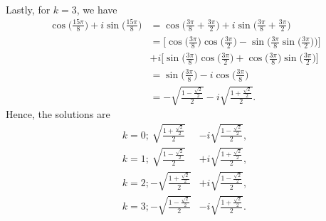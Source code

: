 \documentclass[a4paper]{article}
\begin{document}
\begin{enumerate}
\begin{solution}
\begin{align*}
                \end{align*}
                Lastly, for \( k = 3  \), we have
                \begin{align*}
                    \cos \Big(  \frac{ 15 \pi  }{ 8  }  \Big) + i \sin \Big(  \frac{ 15 \pi  }{ 8 }  \Big) &= \cos \Big(  \frac{ 3 \pi  }{ 8 }  + \frac{ 3 \pi  }{  2  }  \Big) + i \sin \Big(  \frac{ 3 \pi  }{ 8  }  + \frac{ 3 \pi  }{  2  }  \Big) \\
                                                                                                           &= \Big[ \cos \Big(  \frac{ 3 \pi  }{  8  }   \Big) \cos \Big(  \frac{ 3 \pi  }{  2 }  \Big) - \sin \Big(  \frac{ 3 \pi  }{  8  } \sin \Big(  \frac{ 3 \pi }{ 2 }  \Big) \Big)\Big]  \\
                                                                                                           &+ i \Big[ \sin \Big(  \frac{ 3 \pi  }{ 8  } \Big)  \cos \Big(  \frac{ 3 \pi }{ 2 }  \Big)  + \cos \Big(  \frac{ 3 \pi  }{ 8  } \Big)  \sin \Big(  \frac{ 3 \pi  }{  2  }   \Big) \Big] \\
                                                                                                           &= \sin \Big(  \frac{ 3 \pi  }{  8  }  \Big) - i \cos \Big(  \frac{ 3 \pi  }{ 8  }  \Big) \\
                                                                                                           &= -\sqrt{ \frac{ 1 - \frac{ \sqrt{ 2 }   }{ 2 }  }{ 2 }  }  - i \sqrt{ \frac{ 1 + \frac{ \sqrt{ 2 }  }{ 2 }  }{ 2 }  }.
                \end{align*}
                Hence, the solutions are 
                \begin{align*}
                    k = 0;  \  \sqrt{ \frac{ 1 + \frac{ \sqrt{ 2 }  }{ 2 }  }{ 2 }  }  &- i \sqrt{ \frac{ 1 - \frac{ \sqrt{ 2 }  }{ 2 }  }{ 2 }   },  \\
                    k = 1; \  \sqrt{ \frac{ 1 - \frac{ \sqrt{ 2 }  }{ 2 }  }{ 2 }  }  &+ i \sqrt{ \frac{ 1 + \frac{ \sqrt{ 2 }  }{ 2 }  }{ 2 }  }, \\ 
                    k= 2;  -\sqrt{ \frac{ 1 + \frac{ \sqrt{ 2 }  }{ 2 }  }{ 2 }  }  &+ i \sqrt{ \frac{ 1 - \frac{ \sqrt{ 2 }  }{ 2 }  }{ 2 }  }, \\
                    k=3;  -\sqrt{ \frac{ 1 - \frac{ \sqrt{ 2 }  }{ 2 }  }{ 2 }   }  &- i \sqrt{ \frac{ 1 + \frac{ \sqrt{ 2 }  }{ 2 }  }{ 2 }  }.
                \end{align*}
            \end{solution}

\end{enumerate}
\end{document}
